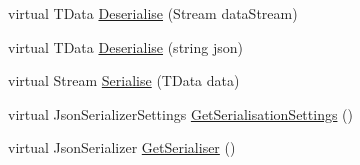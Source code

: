 \begin{DoxyCompactItemize}
virtual T\+Data \hyperlink{classCqrs_1_1Azure_1_1BlobStorage_1_1StorageStore_a211bc47bff1108d10e319fee8b9769a0_a211bc47bff1108d10e319fee8b9769a0}{Deserialise} (Stream data\+Stream)
\item 
virtual T\+Data \hyperlink{classCqrs_1_1Azure_1_1BlobStorage_1_1StorageStore_adea25452991418693ed966797581f67f_adea25452991418693ed966797581f67f}{Deserialise} (string json)
\item 
virtual Stream \hyperlink{classCqrs_1_1Azure_1_1BlobStorage_1_1StorageStore_a8e5d4e50e054d963f96aaa4808794718_a8e5d4e50e054d963f96aaa4808794718}{Serialise} (T\+Data data)
\item 
virtual Json\+Serializer\+Settings \hyperlink{classCqrs_1_1Azure_1_1BlobStorage_1_1StorageStore_a9ded88f1b48cf61b3be826fb0997adfb_a9ded88f1b48cf61b3be826fb0997adfb}{Get\+Serialisation\+Settings} ()
\item 
virtual Json\+Serializer \hyperlink{classCqrs_1_1Azure_1_1BlobStorage_1_1StorageStore_acca953271229a19433db9c38c85b5b9e_acca953271229a19433db9c38c85b5b9e}{Get\+Serialiser} ()
\end{DoxyCompactItemize}
